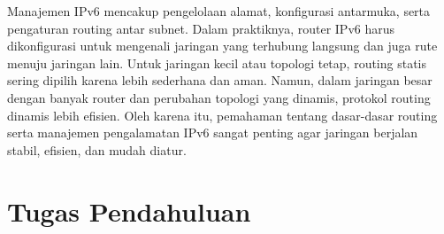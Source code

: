 Manajemen IPv6 mencakup pengelolaan alamat, konfigurasi antarmuka, serta pengaturan routing antar subnet. Dalam praktiknya, router IPv6 harus dikonfigurasi untuk mengenali jaringan yang terhubung langsung dan juga rute menuju jaringan lain. Untuk jaringan kecil atau topologi tetap, routing statis sering dipilih karena lebih sederhana dan aman. Namun, dalam jaringan besar dengan banyak router dan perubahan topologi yang dinamis, protokol routing dinamis lebih efisien. Oleh karena itu, pemahaman tentang dasar-dasar routing serta manajemen pengalamatan IPv6 sangat penting agar jaringan berjalan stabil, efisien, dan mudah diatur.

\section{Tugas Pendahuluan}
